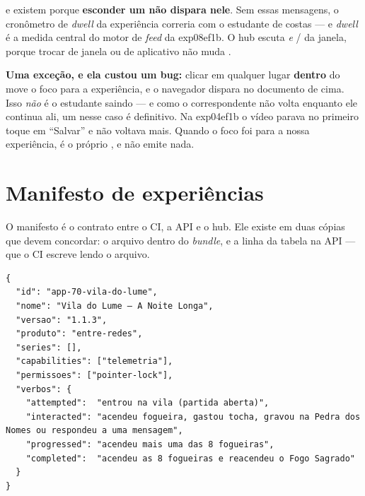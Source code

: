 \begin{atencao}
 e  existem porque \textbf{esconder um
 não dispara  nele}. Sem essas mensagens, o
cronômetro de \emph{dwell} da experiência correria com o estudante de costas --- e
\emph{dwell} é a medida central do motor de \emph{feed} da exp08ef1b. O hub escuta
 \emph{e} / da janela, porque trocar de
janela ou de aplicativo não muda .

\textbf{Uma exceção, e ela custou um bug:} clicar em qualquer lugar
\textbf{dentro} do  move o foco para a experiência, e o navegador
dispara  no documento de cima. Isso \emph{não} é o estudante saindo --- e
como o  correspondente não volta enquanto ele continua ali, um
 nesse caso é definitivo. Na exp04ef1b o vídeo parava no primeiro
toque em \enquote{Salvar} e não voltava mais. Quando o foco foi para a nossa
experiência,  é o próprio , e
 não emite nada.
\end{atencao}

\section{Manifesto de experiências}
\label{sec:manifesto}

O manifesto é o contrato entre o CI, a API e o hub. Ele existe em duas cópias
que devem concordar: o arquivo  dentro do
\emph{bundle}, e a linha da tabela  na API --- que o CI escreve
lendo o arquivo.

\begin{lstlisting}[language=jsonunoo, caption={\arq{apps/experiencias/app-70-vila-do-lume/public/experiencia.json}}, label={lst:manifesto}]
{
  "id": "app-70-vila-do-lume",
  "nome": "Vila do Lume — A Noite Longa",
  "versao": "1.1.3",
  "produto": "entre-redes",
  "series": [],
  "capabilities": ["telemetria"],
  "permissoes": ["pointer-lock"],
  "verbos": {
    "attempted":  "entrou na vila (partida aberta)",
    "interacted": "acendeu fogueira, gastou tocha, gravou na Pedra dos Nomes ou respondeu a uma mensagem",
    "progressed": "acendeu mais uma das 8 fogueiras",
    "completed":  "acendeu as 8 fogueiras e reacendeu o Fogo Sagrado"
  }
}
\end{lstlisting}

